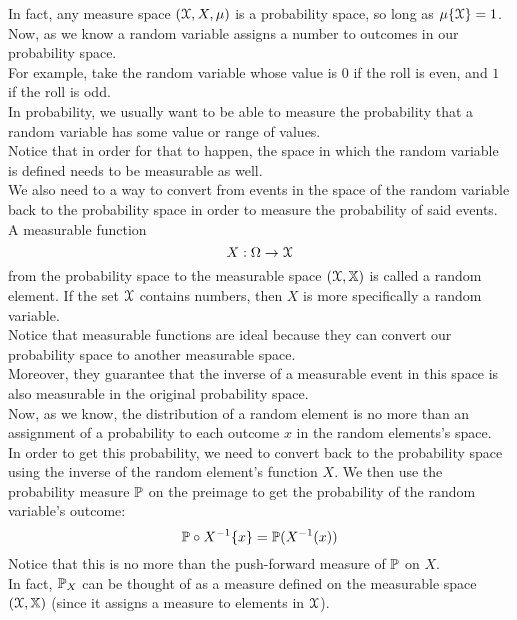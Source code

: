 \documentclass[12pt]{article}
\begin{document}
    In fact, any measure space
    $ (\mathcal{X}, X, \mu) $
    is a probability space,
    so long as $\mu\{\mathcal{X}\} = 1$. \\

    Now, as we know a random variable
    assigns a number to outcomes
    in our probability space. \\
    For example, take the random
    variable whose value is $0$
    if the roll is even, and $1$
    if the roll is odd. \\
    In probability, we usually
    want to be able to measure the probability
    that a random variable has
    some value or range of values. \\
    Notice that in order for that to happen,
    the space in which the random variable
    is defined needs to be measurable 
    as well. \\
    We also need to a way to convert from
    events in the space of the random variable
    back to the probability space in order to
    measure the probability of said events. \\

    A measurable function
    \[ X: \Omega \to \mathcal{X} \]
    from the probability space to the measurable
    space $(\mathcal{X}, \mathbb{X})$
    is called a random element.
    If the set $\mathcal{X}$ contains numbers,
    then $X$ is more specifically a random variable. \\
    Notice that measurable functions are ideal
    because they can convert our probability
    space to another measurable space. \\
    Moreover, they guarantee that the inverse
    of a measurable event in this space
    is also measurable in the original probability
    space. \\

    Now, as we know, the distribution of a
    random element is no more than an assignment
    of a probability to each outcome $x$
    in the random elements's space. \\
    In order to get this probability,
    we need to convert back to the probability
    space using the inverse of the random element's
    function $X$.
    We then use the probability measure $\mathbb{P}$
    on the preimage to get the probability
    of the random variable's outcome:
    \[ \mathbb{P} \circ X^{-1} \{x\} 
    = \mathbb{P}(X^{-1} (x)) \]
    Notice that this is no more than the
    push-forward measure of $\mathbb{P}$ on $X$. \\
    In fact, $\mathbb{P}_X$ can be thought of
    as a measure defined on the measurable
    space $(\mathcal{X}, \mathbb{X})$
    (since it assigns a measure to elements
    in $\mathcal{X}$). \\
\end{document}
